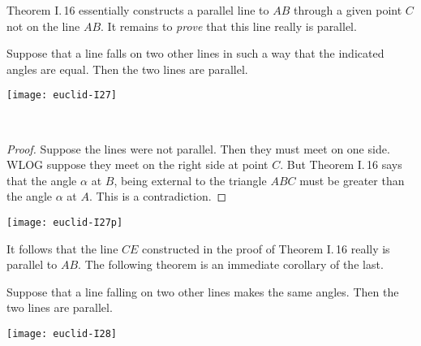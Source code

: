 \noindent Theorem I.\,16 essentially constructs a parallel line to $AB$ through a given point $C$ not on the line $AB$. It remains to \emph{prove} that this line really is parallel.

\noindent\begin{minipage}[t]{0.55\textwidth}\vspace{0pt}
\begin{thm*}[I.\,27]
Suppose that a line falls on two other lines in such a way that the indicated angles are equal. Then the two lines are parallel.
\end{thm*}
\end{minipage}\hfill
\begin{minipage}[t]{0.4\textwidth}\vspace{0pt}
\flushright\texttt{[image: euclid-I27]}
\end{minipage}\\

\noindent\begin{minipage}[t]{0.55\textwidth}\vspace{0pt}
\begin{proof}
Suppose the lines were not parallel. Then they must meet on one side. WLOG suppose they meet on the right side at point $C$. But Theorem I.\,16 says that the angle $\alpha$ at $B$, being external to the triangle $ABC$ must be greater than the angle $\alpha$ at $A$. This is a contradiction.
\end{proof}
\end{minipage}\hfill
\begin{minipage}[t]{0.4\textwidth}\vspace{0pt}
\flushright\texttt{[image: euclid-I27p]}
\end{minipage}

\noindent It follows that the line $CE$ constructed in the proof of Theorem I.\,16 really is parallel to $AB$. The following theorem is an immediate corollary of the last.

\noindent\begin{minipage}[t]{0.55\textwidth}\vspace{0pt}
\begin{thm*}[I.\,28]
Suppose that a line falling on two other lines makes the same angles. Then the two lines are parallel.
\end{thm*}
\end{minipage}\hfill
\begin{minipage}[t]{0.4\textwidth}\vspace{0pt}
\flushright\texttt{[image: euclid-I28]}
\end{minipage}\\[10pt]

